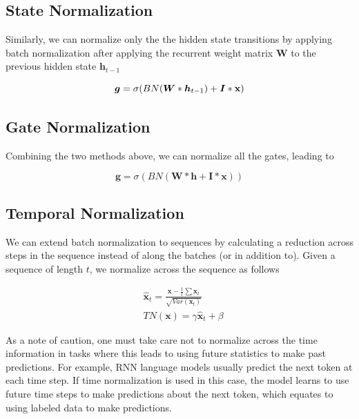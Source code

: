 \documentclass{article}
\def\x{{\mathbf x}}
\begin{document}
\subsection{State Normalization} Similarly, we can normalize only the the hidden state transitions by applying batch normalization after applying the recurrent weight matrix $\boldsymbol W$ to the previous hidden state $\boldsymbol h_{t-1}$

\begin{equation}
	\boldsymbol g = \sigma(BN(\boldsymbol W * \boldsymbol h_{t-1}) + \boldsymbol I * \x) \\
\end{equation} 

\subsection{Gate Normalization} Combining the two methods above, we can normalize all the gates, leading to 

\begin{equation}
	\boldsymbol g = \sigma(BN(\boldsymbol W * \boldsymbol h + \boldsymbol I * \x)) \nonumber
\end{equation}

\subsection{Temporal Normalization}
We can extend batch normalization to sequences by calculating a reduction across steps in the sequence instead of along the batches (or in addition to). Given a sequence of length $t$, we normalize across the sequence as follows

\begin{equation}
	\begin{split}
		& \hat \x_t = \frac{\boldsymbol x - \frac{1}{t} \sum \x_t}{\sqrt{Var(\x_t)}} \\
		& TN(\x) = \gamma \hat \x_t + \beta
	\end{split}
\end{equation}

As a note of caution, one must take care not to normalize across the time information in tasks where this leads to using future statistics to make past predictions. For example, RNN language models usually predict the next token at each time step. If time normalization is used in this case, the model learns to use future time steps to make predictions about the next token, which equates to using labeled data to make predictions.
\end{document}
